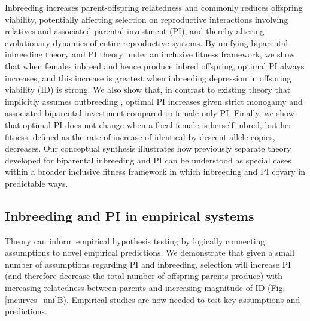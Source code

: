 \documentclass[10pt,letterpaper]{article}
\begin{document}
Inbreeding increases parent-offspring relatedness and commonly reduces offspring viability, potentially affecting selection on reproductive interactions involving relatives and associated parental investment (PI), and thereby altering evolutionary dynamics of entire reproductive systems. By unifying biparental inbreeding theory and PI theory under an inclusive fitness framework, we show that when females inbreed and hence produce inbred offspring, optimal PI always increases, and this increase is greatest when inbreeding depression in offspring viability (ID) is strong. We also show that, in contrast to existing theory that implicitly assumes outbreeding \cite[][]{Parker1985}, optimal PI increases given strict monogamy and associated biparental investment compared to female-only PI. Finally, we show that optimal PI does not change when a focal female is herself inbred, but her fitness, defined as the rate of increase of identical-by-descent allele copies, decreases. Our conceptual synthesis illustrates how previously separate theory developed for biparental inbreeding \cite[][]{Parker1979, Parker2006} and PI \cite[][]{Macnair1978, Parker1978} can be understood as special cases within a broader inclusive fitness framework in which inbreeding and PI covary in predictable ways.

\subsection*{Inbreeding and PI in empirical systems}

Theory can inform empirical hypothesis testing by logically connecting assumptions to novel empirical predictions. We demonstrate that given a small number of assumptions regarding PI and inbreeding, selection will increase PI (and therefore decrease the total number of offspring parents produce) with increasing relatedness between parents and increasing magnitude of ID (Fig. \ref{mcurves_uni}B). Empirical studies are now needed to test key assumptions and predictions.
\end{document}
